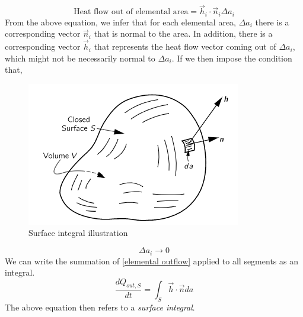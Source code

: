 \begin{equation}
	\label{elemental outflow}
	\text{Heat flow out of elemental area} = \vec{h}_{i} \cdot \vec{n}_{i} \Delta a_{i}
\end{equation}
From the above equation, we infer that for each elemental area, $\Delta a_{i}$ there is a corresponding vector $\vec{n}_{i}$ that is normal to the area. In addition, there is a corresponding vector $\vec{h}_{i}$ that represents the heat flow vector coming out of $\Delta a_{i}$, which might not be necessarily normal to $\Delta a_{i}$. If we then impose the condition that, 
\begin{figure}[H]
    \centering
    \includegraphics[scale = 0.6]{math prelim/images_math prelim/surface integral}
    \caption{Surface integral illustration}
    \label{Surface int pic}
\end{figure}
\begin{equation}
	\Delta a_{i} \to 0 
\end{equation}
We can write the summation of \autoref{elemental outflow} applied to all segments as an integral. 
\begin{equation}
	\frac{d Q_{out, S}}{dt} = \int_{S} \vec{h} \cdot \vec{n} da
\end{equation}
The above equation then refers to a \emph{surface integral}. 
